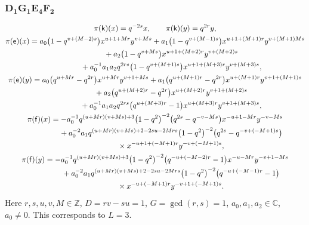 \documentclass[10pt,a4paper]{amsart}
\numberwithin{equation}{section}
\begin{document}
\subsubsection*{$\boldsymbol{D_1G_1E_4F_2}$}
\begin{gather*}
\pi(\mathsf{k})(x)= q^{-2s}x ,\qquad\pi(\mathsf{k})(y)=q^{2r}y ,\\
\pi(\mathsf{e})(x)= a_0\big(1-q^{v+(M-2)s}\big)x^{u+1+Mr}y^{v+Ms}+ a_1\big(1-q^{v+(M-1)s}\big)x^{u+1+(M+1)r}y^{v+(M+1)Ms}\\
\hphantom{\pi(\mathsf{e})(x)=}{}+ a_2\big(1-q^{v+Ms}\big)x^{u+1+(M+2)r}y^{v+(M+2)s}\\
\hphantom{\pi(\mathsf{e})(x)=}{}+ a_0^{-1}a_1a_2q^{2rs}\big(1-q^{v+(M+1)s}\big)x^{u+1+(M+3)r}y^{v+(M+3)s} ,\\
\pi(\mathsf{e})(y)= a_0\big(q^{u+Mr}-q^{2r}\big)x^{u+Mr}y^{v+1+Ms}+ a_1\big(q^{u+(M+1)r}-q^{2r}\big)x^{u+(M+1)r}y^{v+1+(M+1)s}\\
\hphantom{\pi(\mathsf{e})(y)=}{}+ a_2\big(q^{u+(M+2)r}-q^{2r}\big)x^{u+(M+2)r}y^{v+1+(M+2)s}\\
\hphantom{\pi(\mathsf{e})(y)=}{}+ a_0^{-1}a_1a_2q^{2rs}\big(q^{u+(M+3)r}-1\big)x^{u+(M+3)r}y^{v+1+(M+3)s} ,\\
\pi(\mathsf{f})(x)= -a_0^{-1}q^{(u+Mr)(v+Ms)+3}\big(1-q^2\big)^{-2}\big(q^{2s}-q^{-v-Ms}\big)x^{-u+1-Mr}y^{-v-Ms}\\
\hphantom{\pi(\mathsf{f})(x)=}{} + a_0^{-2}a_1q^{(u+Mr)(v+Ms)+2-2su-2Mrs}\big(1-q^2\big)^{-2} \big(q^{2s}-q^{-v+(-M+1)s}\big)\\
\hphantom{\pi(\mathsf{f})(x)=}{}\times x^{-u+1+(-M+1)r}y^{-v+(-M+1)s} ,\\
\pi(\mathsf{f})(y)= -a_0^{-1}q^{(u+Mr)(v+Ms)+3}\big(1-q^2\big)^{-2}\big(q^{-u+(-M-2)r}-1\big)x^{-u-Mr}y^{-v+1-Ms}\\
\hphantom{\pi(\mathsf{f})(y)=}{}+ a_0^{-2}a_1q^{(u+Mr)(v+Ms)+2-2su-2Mrs}\big(1-q^2\big)^{-2}\big(q^{-u+(-M-1)r}-1\big)\\
\hphantom{\pi(\mathsf{f})(y)=}{}\times x^{-u+(-M+1)r}y^{-v+1+(-M+1)s} .
\end{gather*}
Here $r,s,u,v,M\in\mathbb{Z}$, $D=rv-su=1$, $G=\operatorname{gcd}(r,s)=1$, $a_0,a_1,a_2\in\mathbb{C}$, $a_0\ne 0$. This corresponds to $L=3$.
\end{document}
